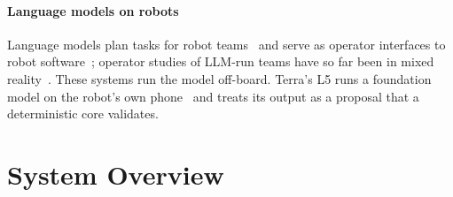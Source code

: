 \documentclass[conference]{IEEEtran}
\begin{document}
\paragraph{Language models on robots}
Language models plan tasks for robot teams~\cite{kannan2024smartllm,chen2024scalable} and serve as operator interfaces to robot software~\cite{royce2025rosa}; operator studies of LLM-run teams have so far been in mixed reality~\cite{yang2026mrpilot}.
These systems run the model off-board.
Terra's L5 runs a foundation model on the robot's own phone~\cite{apple2026foundationmodels} and treats its output as a proposal that a deterministic core validates.

\section{System Overview}
\label{sec:arch}
\end{document}
